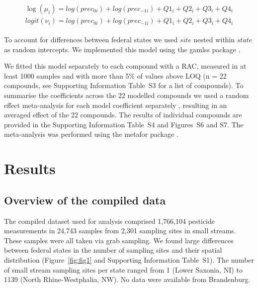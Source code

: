 \documentclass[journal=esthag,manuscript=article]{achemso}
\begin{document}
\begin{align}
\begin{split}
\log(\mu_{i}) = log(prec_{0 i}) + log(prec_{-1 i}) + Q1_{i} + Q2_{i}+Q3_{i}+Q4_{i}\\
logit(\nu_{i}) = log(prec_{0 i}) + log(prec_{-1 i}) + Q1_{i} + Q2_{i}+Q3_{i}+Q4_{i}
\end{split}
\label{eqn:eqn4}
\end{align}

To account for differences between federal states we used $site$ nested within $state$ as random intercepts.
We implemented this model using the gamlss package \cite{stasinopoulos_generalized_2007}. 

We fitted this model separately to each compound with a RAC, measured in at least 1000 samples and with more than 5\% of values above LOQ (n = 22 compounds, see Supporting Information Table~S3 for a list of compounds). 
To summarise the coefficients across the 22 modelled compounds we used a random effect meta-analysis for each model coefficient separately \citep{harrison_getting_2011}, resulting in an averaged effect of the 22 compounds.
The results of individual compounds are provided in the Supporting Information Table~S4 and Figures~S6 and S7.
The meta-analysis was performed using the metafor package \citep{Viechtbauer_2010}. 



\section{Results}
\subsection{Overview of the compiled data}

The compiled dataset used for analysis comprised 1,766,104 pesticide measurements in 24,743 samples from 2,301 sampling sites in small streams.  %
These samples were all taken via grab sampling.  
We found large differences between federal states in the number of sampling sites and their spatial distribution (Figure~\ref{fig:fig1} and Supporting Information Table~S1). 
The number of small stream sampling sites per state ranged from 1 (Lower Saxonia, NI) to 1139 (North Rhine-Westphalia, NW).
No data were available from Brandenburg. 
\end{document}

